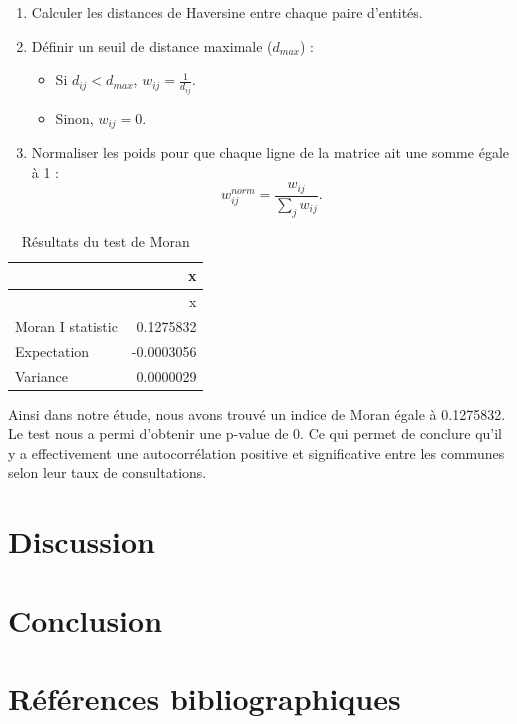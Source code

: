 \documentclass[
]{article}
\providecommand{\tightlist}{%
  \setlength{\itemsep}{0pt}\setlength{\parskip}{0pt}}
\begin{document}
\begin{enumerate}
\def\labelenumi{\arabic{enumi}.}
\tightlist
\item
  Calculer les distances de Haversine entre chaque paire d'entités.
\item
  Définir un seuil de distance maximale (\(d_{max}\)) :

  \begin{itemize}
  \tightlist
  \item
    Si \(d_{ij} < d_{max}\), \(w_{ij} = \frac{1}{d_{ij}}\).
  \item
    Sinon, \(w_{ij} = 0\).
  \end{itemize}
\item
  Normaliser les poids pour que chaque ligne de la matrice ait une somme
  égale à 1 : \[
   w_{ij}^{norm} = \frac{w_{ij}}{\sum_{j} w_{ij}}.
  \]
\end{enumerate}

\begin{longtable}[]{@{}lr@{}}
\caption{Résultats du test de Moran}\tabularnewline
\toprule\noalign{}
& x \\
\midrule\noalign{}
\endfirsthead
\toprule\noalign{}
& x \\
\midrule\noalign{}
\endhead
\bottomrule\noalign{}
\endlastfoot
Moran I statistic & 0.1275832 \\
Expectation & -0.0003056 \\
Variance & 0.0000029 \\
\end{longtable}

Ainsi dans notre étude, nous avons trouvé un indice de Moran égale à
0.1275832. Le test nous a permi d'obtenir une p-value de 0. Ce qui
permet de conclure qu'il y a effectivement une autocorrélation positive
et significative entre les communes selon leur taux de consultations.

\section{Discussion}\label{discussion}

\section{Conclusion}\label{conclusion}

\section{Références
bibliographiques}\label{ruxe9fuxe9rences-bibliographiques}
\end{document}
